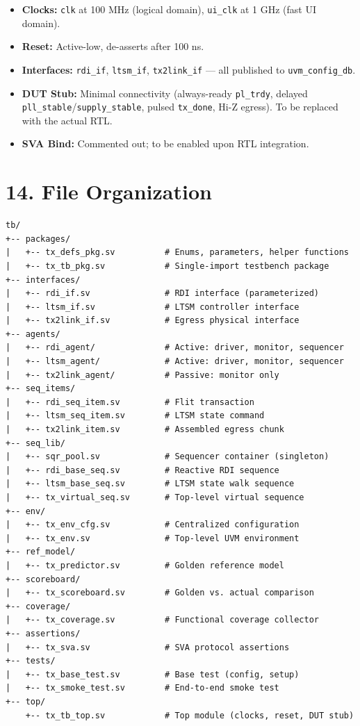 \documentclass[11pt,a4paper]{article}
\begin{document}
\begin{itemize}
  \item \textbf{Clocks:} \texttt{clk} at 100 MHz (logical domain), \texttt{ui\_clk} at 1 GHz (fast UI domain).
  \item \textbf{Reset:} Active-low, de-asserts after 100 ns.
  \item \textbf{Interfaces:} \texttt{rdi\_if}, \texttt{ltsm\_if}, \texttt{tx2link\_if} --- all published to \texttt{uvm\_config\_db}.
  \item \textbf{DUT Stub:} Minimal connectivity (always-ready \texttt{pl\_trdy}, delayed \texttt{pll\_stable}/\texttt{supply\_stable}, pulsed \texttt{tx\_done}, Hi-Z egress). To be replaced with the actual RTL.
  \item \textbf{SVA Bind:} Commented out; to be enabled upon RTL integration.
\end{itemize}



\section{14. File Organization}

{\small
\begin{verbatim}
tb/
+-- packages/
|   +-- tx_defs_pkg.sv          # Enums, parameters, helper functions
|   +-- tx_tb_pkg.sv            # Single-import testbench package
+-- interfaces/
|   +-- rdi_if.sv               # RDI interface (parameterized)
|   +-- ltsm_if.sv              # LTSM controller interface
|   +-- tx2link_if.sv           # Egress physical interface
+-- agents/
|   +-- rdi_agent/              # Active: driver, monitor, sequencer
|   +-- ltsm_agent/             # Active: driver, monitor, sequencer
|   +-- tx2link_agent/          # Passive: monitor only
+-- seq_items/
|   +-- rdi_seq_item.sv         # Flit transaction
|   +-- ltsm_seq_item.sv        # LTSM state command
|   +-- tx2link_item.sv         # Assembled egress chunk
+-- seq_lib/
|   +-- sqr_pool.sv             # Sequencer container (singleton)
|   +-- rdi_base_seq.sv         # Reactive RDI sequence
|   +-- ltsm_base_seq.sv        # LTSM state walk sequence
|   +-- tx_virtual_seq.sv       # Top-level virtual sequence
+-- env/
|   +-- tx_env_cfg.sv           # Centralized configuration
|   +-- tx_env.sv               # Top-level UVM environment
+-- ref_model/
|   +-- tx_predictor.sv         # Golden reference model
+-- scoreboard/
|   +-- tx_scoreboard.sv        # Golden vs. actual comparison
+-- coverage/
|   +-- tx_coverage.sv          # Functional coverage collector
+-- assertions/
|   +-- tx_sva.sv               # SVA protocol assertions
+-- tests/
|   +-- tx_base_test.sv         # Base test (config, setup)
|   +-- tx_smoke_test.sv        # End-to-end smoke test
+-- top/
    +-- tx_tb_top.sv            # Top module (clocks, reset, DUT stub)
\end{verbatim}
}
\end{document}
